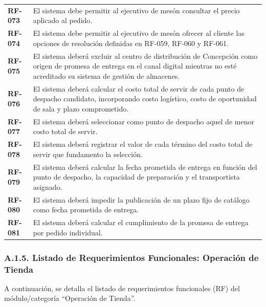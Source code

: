 \documentclass[11pt]{article}
\begin{document}
\begin{longtable}[]{@{}
  >{\raggedright\arraybackslash}p{}
  >{\raggedright\arraybackslash}p{}@{}}
\addlinespace[2pt]
\textbf{RF-073} & El sistema debe permitir al ejecutivo de mesón consultar el precio aplicado al pedido. \\
\addlinespace[2pt]
\textbf{RF-074} & El sistema debe permitir al ejecutivo de mesón ofrecer al cliente las opciones de resolución definidas en RF-059, RF-060 y RF-061. \\
\addlinespace[2pt]
\textbf{RF-075} & El sistema deberá excluir al centro de distribución de Concepción como origen de promesa de entrega en el canal digital mientras no esté acreditado su sistema de gestión de almacenes. \\
\addlinespace[2pt]
\textbf{RF-076} & El sistema deberá calcular el costo total de servir de cada punto de despacho candidato, incorporando costo logístico, costo de oportunidad de sala y plazo comprometido. \\
\addlinespace[2pt]
\textbf{RF-077} & El sistema deberá seleccionar como punto de despacho aquel de menor costo total de servir. \\
\addlinespace[2pt]
\textbf{RF-078} & El sistema deberá registrar el valor de cada término del costo total de servir que fundamento la selección. \\
\addlinespace[2pt]
\textbf{RF-079} & El sistema deberá calcular la fecha prometida de entrega en función del punto de despacho, la capacidad de preparación y el transportista asignado. \\
\addlinespace[2pt]
\textbf{RF-080} & El sistema deberá impedir la publicación de un plazo fijo de catálogo como fecha prometida de entrega. \\
\addlinespace[2pt]
\textbf{RF-081} & El sistema deberá calcular el cumplimiento de la promesa de entrega por pedido individual. \\
\end{longtable}

\subsubsection{A.1.5. Listado de Requerimientos Funcionales: Operación de Tienda}\label{a-1-5-listado-de-requerimientos-funcionales-operacion-de-tienda}

A continuación, se detalla el listado de requerimientos funcionales (RF) del módulo/categoría ``Operación de Tienda''.
\end{document}
